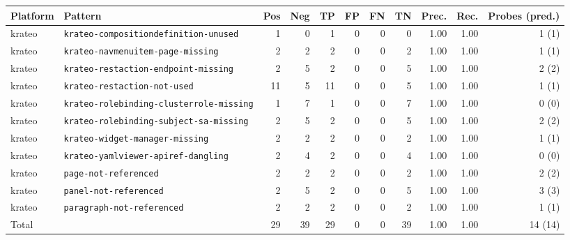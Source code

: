 \begin{tabular}{llrrrrrrrrr}
\toprule
Platform & Pattern & Pos & Neg & TP & FP & FN & TN & Prec. & Rec. & Probes (pred.) \\
\midrule
krateo & \texttt{krateo-compositiondefinition-unused} & 1 & 0 & 1 & 0 & 0 & 0 & 1.00 & 1.00 & 1 (1) \\
krateo & \texttt{krateo-navmenuitem-page-missing} & 2 & 2 & 2 & 0 & 0 & 2 & 1.00 & 1.00 & 1 (1) \\
krateo & \texttt{krateo-restaction-endpoint-missing} & 2 & 5 & 2 & 0 & 0 & 5 & 1.00 & 1.00 & 2 (2) \\
krateo & \texttt{krateo-restaction-not-used} & 11 & 5 & 11 & 0 & 0 & 5 & 1.00 & 1.00 & 1 (1) \\
krateo & \texttt{krateo-rolebinding-clusterrole-missing} & 1 & 7 & 1 & 0 & 0 & 7 & 1.00 & 1.00 & 0 (0) \\
krateo & \texttt{krateo-rolebinding-subject-sa-missing} & 2 & 5 & 2 & 0 & 0 & 5 & 1.00 & 1.00 & 2 (2) \\
krateo & \texttt{krateo-widget-manager-missing} & 2 & 2 & 2 & 0 & 0 & 2 & 1.00 & 1.00 & 1 (1) \\
krateo & \texttt{krateo-yamlviewer-apiref-dangling} & 2 & 4 & 2 & 0 & 0 & 4 & 1.00 & 1.00 & 0 (0) \\
krateo & \texttt{page-not-referenced} & 2 & 2 & 2 & 0 & 0 & 2 & 1.00 & 1.00 & 2 (2) \\
krateo & \texttt{panel-not-referenced} & 2 & 5 & 2 & 0 & 0 & 5 & 1.00 & 1.00 & 3 (3) \\
krateo & \texttt{paragraph-not-referenced} & 2 & 2 & 2 & 0 & 0 & 2 & 1.00 & 1.00 & 1 (1) \\
\midrule
\multicolumn{2}{l}{Total} & 29 & 39 & 29 & 0 & 0 & 39 & 1.00 & 1.00 & 14 (14) \\
\bottomrule
\end{tabular}
